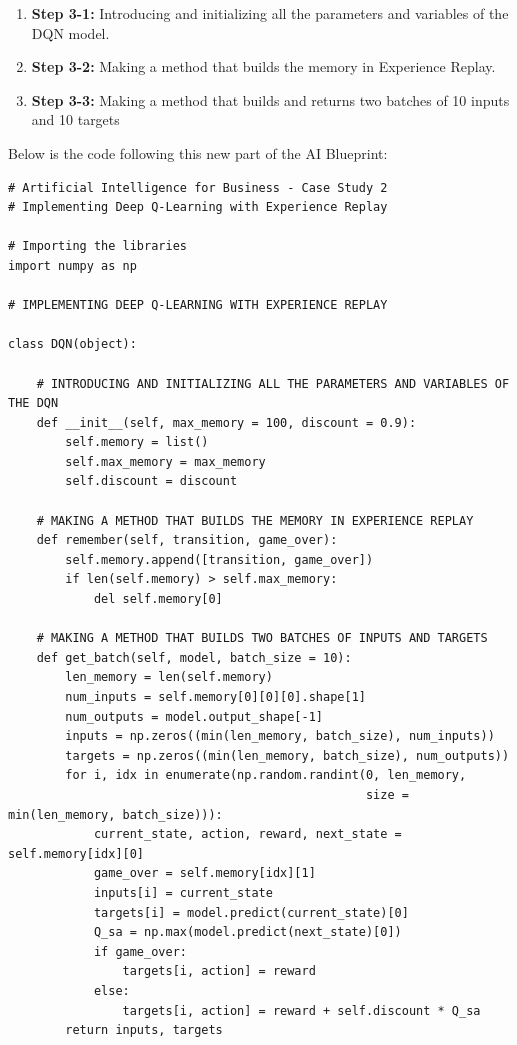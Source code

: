 \documentclass[]{book}
\begin{document}
\begin{enumerate}
    \item \textbf{Step 3-1:} Introducing and initializing all the parameters and variables of the DQN model.
    \item \textbf{Step 3-2:} Making a method that builds the memory in Experience Replay.
    \item \textbf{Step 3-3:} Making a method that builds and returns two batches of 10 inputs and 10 targets
\end{enumerate}

Below is the code following this new part of the AI Blueprint:

\begin{lstlisting}
# Artificial Intelligence for Business - Case Study 2
# Implementing Deep Q-Learning with Experience Replay

# Importing the libraries
import numpy as np

# IMPLEMENTING DEEP Q-LEARNING WITH EXPERIENCE REPLAY

class DQN(object):
    
    # INTRODUCING AND INITIALIZING ALL THE PARAMETERS AND VARIABLES OF THE DQN
    def __init__(self, max_memory = 100, discount = 0.9):
        self.memory = list()
        self.max_memory = max_memory
        self.discount = discount

    # MAKING A METHOD THAT BUILDS THE MEMORY IN EXPERIENCE REPLAY
    def remember(self, transition, game_over):
        self.memory.append([transition, game_over])
        if len(self.memory) > self.max_memory:
            del self.memory[0]

    # MAKING A METHOD THAT BUILDS TWO BATCHES OF INPUTS AND TARGETS
    def get_batch(self, model, batch_size = 10):
        len_memory = len(self.memory)
        num_inputs = self.memory[0][0][0].shape[1]
        num_outputs = model.output_shape[-1]
        inputs = np.zeros((min(len_memory, batch_size), num_inputs))
        targets = np.zeros((min(len_memory, batch_size), num_outputs))
        for i, idx in enumerate(np.random.randint(0, len_memory,
                                                  size = min(len_memory, batch_size))):
            current_state, action, reward, next_state = self.memory[idx][0]
            game_over = self.memory[idx][1]
            inputs[i] = current_state
            targets[i] = model.predict(current_state)[0]
            Q_sa = np.max(model.predict(next_state)[0])
            if game_over:
                targets[i, action] = reward
            else:
                targets[i, action] = reward + self.discount * Q_sa
        return inputs, targets
\end{lstlisting}
\end{document}
